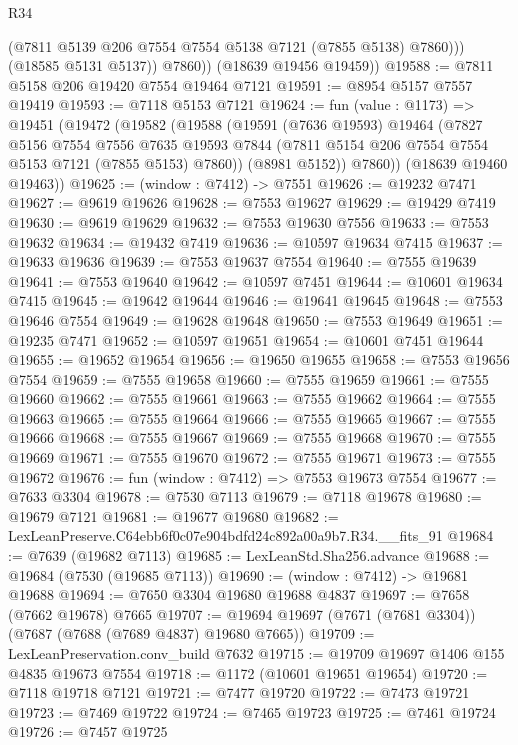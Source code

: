 \begin{lexlean}{R34}
\begin{coremodule}
                (@7811 @5139 @206 @7554 @7554 @5138 @7121 (@7855 @5138) @7860)))
            (@18585 @5131 @5137))
          @7860))
      (@18639 @19456 @19459))
@19588 := @7811 @5158 @206 @19420 @7554 @19464 @7121
@19591 := @8954 @5157 @7557 @19419
@19593 := @7118 @5153 @7121
@19624 := fun (value : @1173) =>
  @19451
    (@19472
      (@19582
        (@19588
          (@19591
            (@7636 @19593)
            @19464
            (@7827
              @5156
              @7554
              @7556
              @7635
              @19593
              @7844
              (@7811 @5154 @206 @7554 @7554 @5153 @7121 (@7855 @5153) @7860))
            (@8981 @5152))
          @7860))
      (@18639 @19460 @19463))
@19625 := (window : @7412) -> @7551
@19626 := @19232 @7471
@19627 := @9619 @19626
@19628 := @7553 @19627
@19629 := @19429 @7419
@19630 := @9619 @19629
@19632 := @7553 @19630 @7556
@19633 := @7553 @19632
@19634 := @19432 @7419
@19636 := @10597 @19634 @7415
@19637 := @19633 @19636
@19639 := @7553 @19637 @7554
@19640 := @7555 @19639
@19641 := @7553 @19640
@19642 := @10597 @7451
@19644 := @10601 @19634 @7415
@19645 := @19642 @19644
@19646 := @19641 @19645
@19648 := @7553 @19646 @7554
@19649 := @19628 @19648
@19650 := @7553 @19649
@19651 := @19235 @7471
@19652 := @10597 @19651
@19654 := @10601 @7451 @19644
@19655 := @19652 @19654
@19656 := @19650 @19655
@19658 := @7553 @19656 @7554
@19659 := @7555 @19658
@19660 := @7555 @19659
@19661 := @7555 @19660
@19662 := @7555 @19661
@19663 := @7555 @19662
@19664 := @7555 @19663
@19665 := @7555 @19664
@19666 := @7555 @19665
@19667 := @7555 @19666
@19668 := @7555 @19667
@19669 := @7555 @19668
@19670 := @7555 @19669
@19671 := @7555 @19670
@19672 := @7555 @19671
@19673 := @7555 @19672
@19676 := fun (window : @7412) => @7553 @19673 @7554
@19677 := @7633 @3304
@19678 := @7530 @7113
@19679 := @7118 @19678
@19680 := @19679 @7121
@19681 := @19677 @19680
@19682 := LexLeanPreserve.C64ebb6f0c07e904bdfd24c892a00a9b7.R34.__fits_91
@19684 := @7639 (@19682 @7113)
@19685 := LexLeanStd.Sha256.advance
@19688 := @19684 (@7530 (@19685 @7113))
@19690 := (window : @7412) -> @19681 @19688
@19694 := @7650 @3304 @19680 @19688 @4837
@19697 := @7658 (@7662 @19678) @7665
@19707 := @19694 @19697 (@7671 (@7681 @3304)) (@7687 (@7688 (@7689 @4837) @19680 @7665))
@19709 := LexLeanPreservation.conv_build @7632
@19715 := @19709 @19697 @1406 @155 @4835 @19673 @7554
@19718 := @1172 (@10601 @19651 @19654)
@19720 := @7118 @19718 @7121
@19721 := @7477 @19720
@19722 := @7473 @19721
@19723 := @7469 @19722
@19724 := @7465 @19723
@19725 := @7461 @19724
@19726 := @7457 @19725

\end{coremodule}
\end{lexlean}
